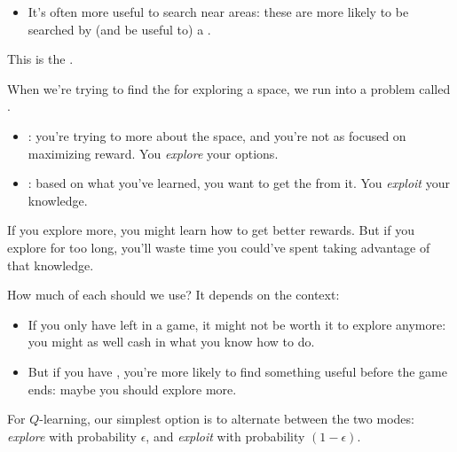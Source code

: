         \begin{itemize}
            \item It's often more useful to search near  areas: these are more likely to be searched by (and be useful to) a . 
            
        \end{itemize}

        This is the .\\

        \begin{definition}
            When we're trying to find the  for exploring a space, we run into a problem called .

            \begin{itemize}
                \item {}: you're trying to  more about the space, and you're not as focused on maximizing reward. You \textit{explore} your options.
                
                \item {}: based on what you've learned, you want to get the  from it. You \textit{exploit} your knowledge.
            \end{itemize}

            If you explore more, you might learn how to get better rewards. But if you explore for too long, you'll waste time you could've spent taking advantage of that knowledge.
        \end{definition}

        How much of each should we use? It depends on the context:

        \begin{itemize}
            \item If you only have  left in a game, it might not be worth it to explore anymore: you might as well cash in what you know how to do.

            \item But if you have , you're more likely to find something useful before the game ends: maybe you should explore more.
        \end{itemize}

        For $Q$-learning, our simplest option is to  alternate between the two modes: \textit{explore} with probability $\epsilon$, and \textit{exploit} with probability $(1-\epsilon)$.\\

